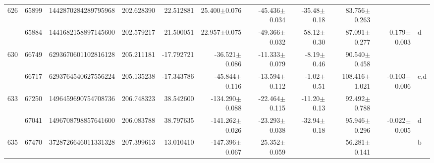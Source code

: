 \documentclass{ws-ijmpd}
\begin{document}
\begin{landscape}
\begin{longtable}{rrrrrrrrrrl}
 \hline 626 &   65899 &      1442870284289795968 &                   202.628390 &                    22.512881 &                 25.400$\pm$0.076 &                -45.436$\pm$0.034 &         -35.48$\pm$  0.18 &        83.756$\pm$0.263 &                                           &                                                    \\
            &   65884 &      1441682158897145600 &                   202.579217 &                    21.500051 &                 22.957$\pm$0.075 &                -49.366$\pm$0.032 &          58.12$\pm$  0.30 &        87.091$\pm$0.277 &                           0.179$\pm$0.003 &                                                  d \\
 \hline 630 &   66749 &      6293670601102816128 &                   205.211181 &                   -17.792721 &                -36.521$\pm$0.086 &                -11.333$\pm$0.079 &          -8.19$\pm$  0.46 &        90.540$\pm$0.458 &                                           &                                                    \\
            &   66717 &      6293764540627556224 &                   205.135238 &                   -17.343786 &                -45.844$\pm$0.116 &                -13.594$\pm$0.112 &          -1.02$\pm$  0.51 &       108.416$\pm$1.021 &                          -0.103$\pm$0.006 &                                                c,d \\
 \hline 633 &   67250 &      1496459690754708736 &                   206.748323 &                    38.542600 &               -134.290$\pm$0.088 &                -22.464$\pm$0.115 &         -11.20$\pm$  0.13 &        92.492$\pm$0.788 &                                           &                                                    \\
            &   67041 &      1496708798857641600 &                   206.083788 &                    38.797635 &               -141.262$\pm$0.026 &                -23.293$\pm$0.038 &         -32.94$\pm$  0.18 &        95.946$\pm$0.296 &                          -0.022$\pm$0.005 &                                                  d \\
 \hline 635 &   67470 &      3728726646011331328 &                   207.399613 &                    13.010410 &               -147.396$\pm$0.067 &                 25.352$\pm$0.059 &                           &        56.281$\pm$0.141 &                                           &                                                  b \\

\end{longtable}
\end{landscape}
\end{document}
